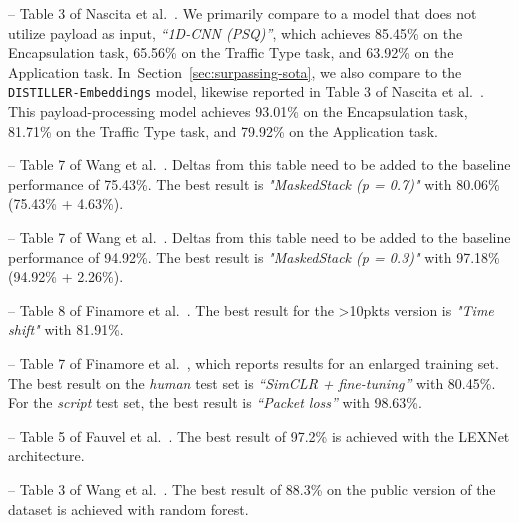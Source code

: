 \documentclass[lettersize,journal,twoside,article]{IEEEtran}
\newcommand{\secref}[1]{Section~\ref{#1}}
\begin{document}
{\small
\begin{description}[leftmargin=14pt]
    \item[ISCXVPN2016, accuracy] -- Table 3 of Nascita et al.~\cite{Nascita2023Embeddings}. We primarily compare to a model that does not utilize payload as input, \textit{“1D-CNN (PSQ)”}, which achieves 85.45\% on the Encapsulation task, 65.56\% on the Traffic Type task, and 63.92\% on the Application task. In~\secref{sec:surpassing-sota}, we also compare to the  \texttt{DISTILLER-Embeddings} model, likewise reported in Table 3 of Nascita et al.~\cite{Nascita2023Embeddings}. This payload-processing model achieves 93.01\% on the Encapsulation task, 81.71\% on the Traffic Type task, and 79.92\% on the Application task.    
    \item[MIRAGE19, weighted F1-score] -- Table 7 of Wang et al.~\cite{wang2024augmentation}. Deltas from this table need to be added to the baseline performance of 75.43\%. The best result is \textit{"MaskedStack (p = 0.7)"} with 80.06\% (75.43\% + 4.63\%).
    \item[MIRAGE22, weighted F1-score] -- Table 7 of Wang et al.~\cite{wang2024augmentation}. Deltas from this table need to be added to the baseline performance of 94.92\%. The best result is \textit{"MaskedStack (p = 0.3)"} with 97.18\% (94.92\% + 2.26\%). 
    \item[UTMOBILENET21, weighted F1-score] -- Table 8 of Finamore et al.~\cite{finamore2023replication}. The best result for the \textgreater10pkts version is \textit{"Time shift"} with 81.91\%.
    \item[UCDAVIS19, accuracy] -- Table 7 of Finamore et al.~\cite{finamore2023replication}, which reports results for an enlarged training set. The best result on the \textit{human} test set is \textit{“SimCLR + fine-tuning”} with 80.45\%. For the \textit{script} test set, the best result is \textit{“Packet loss”} with 98.63\%.
    \item[CESNET-TLS22, accuracy] -- Table 5 of Fauvel et al.~\cite{fauvel2023lightweight}. The best result of 97.2\% is achieved with the LEXNet architecture.
    \item[AppClassNet, accuracy] -- Table 3 of Wang et al.~\cite{dataset_AppClassNet}. The best result of 88.3\% on the public version of the dataset is achieved with random forest.
\end{description}
}
\end{document}
